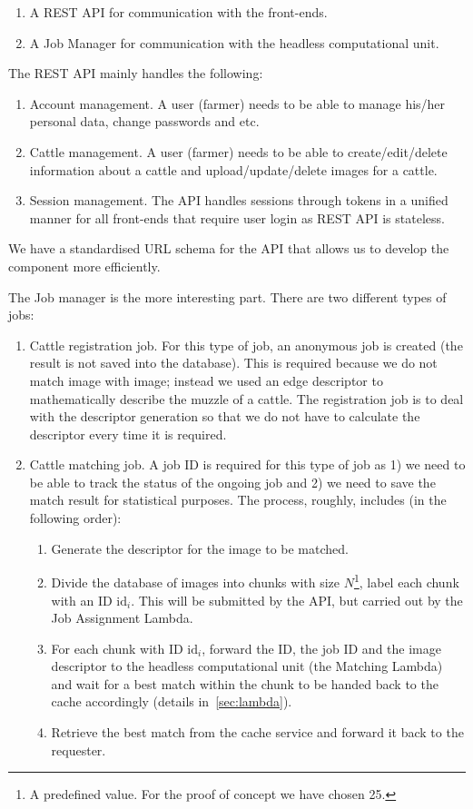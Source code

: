 \begin{enumerate}
	\item A REST API for communication with the front-ends.
	\item A Job Manager for communication with the headless computational unit.
\end{enumerate}

The REST API mainly handles the following:

\begin{enumerate}
	\item Account management. A user (farmer) needs to be able to manage his/her personal data, change passwords and etc.
	\item Cattle management. A user (farmer) needs to be able to create/edit/delete information about a cattle and upload/update/delete images for a cattle.
	\item Session management. The API handles sessions through tokens in a unified manner for all front-ends that require user login as REST API is stateless.
\end{enumerate}

We have a standardised URL schema for the API that allows us to develop the component more efficiently.

The Job manager is the more interesting part. There are two different types of jobs:

\begin{enumerate}
	\item Cattle registration job. For this type of job, an anonymous job is created (the result is not saved into the database). This is required because we do not match image with image; instead we used an edge descriptor to mathematically describe the muzzle of a cattle. The registration job is to deal with the descriptor generation so that we do not have to calculate the descriptor every time it is required.
	\item Cattle matching job. A job ID is required for this type of job as 1) we need to be able to track the status of the ongoing job and 2) we need to save the match result for statistical purposes. The process, roughly, includes (in the following order):
	\begin{enumerate}
		\item Generate the descriptor for the image to be matched.
		\item Divide the database of images into chunks with size $N$\footnote{A predefined value. For the proof of concept we have chosen 25.}, label each chunk with an ID $\text{id}_i$. This will be submitted by the API, but carried out by the Job Assignment Lambda.
		\item For each chunk with ID $\text{id}_i$, forward the ID, the job ID and the image descriptor to the headless computational unit (the Matching Lambda) and wait for a best match within the chunk to be handed back to the cache accordingly (details in~\ref{sec:lambda}).
		\item Retrieve the best match from the cache service and forward it back to the requester.
	\end{enumerate}
\end{enumerate}

